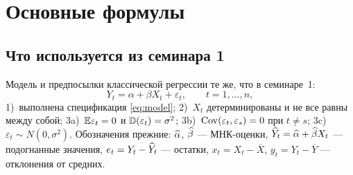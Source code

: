 %
%
%
%


\ifsolutions
\section{Основные формулы}

\subsection{Что используется из семинара 1}\label{sec:recap}

Модель и предпосылки классической регрессии те же, что в семинаре~1:
\begin{equation}
  Y_t = \alpha + \beta X_t + \varepsilon_t, \qquad t = 1,\dots,n,
  \label{eq:model}
\end{equation}
1)~выполнена спецификация \eqref{eq:model}; 2)~$X_t$ детерминированы и не все
равны между собой; 3a)~$\mathbb{E}\varepsilon_t = 0$ и $\mathbb{D}(\varepsilon_t) = \sigma^2$;
3b)~$\mathrm{Cov}(\varepsilon_t,\varepsilon_s) = 0$ при $t \neq s$;
3c)~$\varepsilon_t \sim N(0,\sigma^2)$. Обозначения прежние: $\widehat{\alpha}$, $\widehat{\beta}$ —
МНК-оценки, $\widehat{Y}_t = \widehat{\alpha} + \widehat{\beta} X_t$ — подогнанные значения,
$e_t = Y_t - \widehat{Y}_t$ — остатки, $x_t = X_t - \overline{X}$,
$y_t = Y_t - \overline{Y}$ — отклонения от средних.


